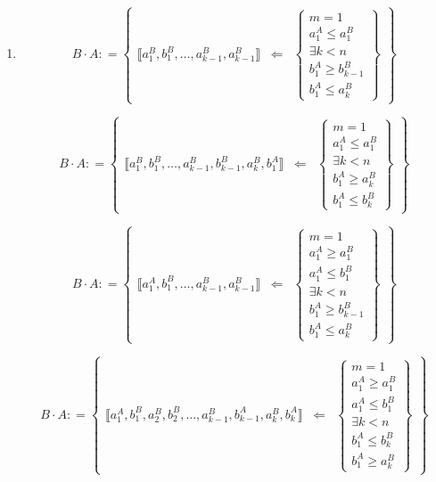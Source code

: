 \documentclass[
]{article}
\begin{document}
\begin{enumerate}
\def\labelenumi{\arabic{enumi}.}
\setcounter{enumi}{5}
\item
  \[{{B \cdot A}{: =}}\begin{Bmatrix}
  {⟦{{a_{1}^{B},b_{1}^{B}},\ldots,{a_{k - 1}^{B},a_{k - 1}^{B}}}⟧} & {\Leftarrow} & \begin{Bmatrix}
  {m = 1} \\
  {a_{1}^{A} \leq a_{1}^{B}} \\
  {\exists{k < n}} \\
  {b_{1}^{A} \geq b_{k - 1}^{B}} \\
  {b_{1}^{A} \leq a_{k}^{B}}
  \end{Bmatrix}
  \end{Bmatrix}\]

  \[{{B \cdot A}{: =}}\begin{Bmatrix}
  {⟦{{a_{1}^{B},b_{1}^{B}},\ldots,{a_{k - 1}^{B},b_{k - 1}^{B}},{a_{k}^{B},b_{1}^{A}}}⟧} & {\Leftarrow} & \begin{Bmatrix}
  {m = 1} \\
  {a_{1}^{A} \leq a_{1}^{B}} \\
  {\exists{k < n}} \\
  {b_{1}^{A} \geq a_{k}^{B}} \\
  {b_{1}^{A} \leq b_{k}^{B}}
  \end{Bmatrix}
  \end{Bmatrix}\]

  \[{{B \cdot A}{: =}}\begin{Bmatrix}
  {⟦{{a_{1}^{A},b_{1}^{B}},\ldots,{a_{k - 1}^{B},a_{k - 1}^{B}}}⟧} & {\Leftarrow} & \begin{Bmatrix}
  {m = 1} \\
  {a_{1}^{A} \geq a_{1}^{B}} \\
  {a_{1}^{A} \leq b_{1}^{B}} \\
  {\exists{k < n}} \\
  {b_{1}^{A} \geq b_{k - 1}^{B}} \\
  {b_{1}^{A} \leq a_{k}^{B}}
  \end{Bmatrix}
  \end{Bmatrix}\]

  \[{{B \cdot A}{: =}}\begin{Bmatrix}
  {⟦{{a_{1}^{A},b_{1}^{B}},{a_{2}^{B},b_{2}^{B}},\ldots,{a_{k - 1}^{B},b_{k - 1}^{A}},{a_{k}^{B},b_{k}^{A}}}⟧} & \Leftarrow & \begin{Bmatrix}
  {m = 1} \\
  {a_{1}^{A} \geq a_{1}^{B}} \\
  {a_{1}^{A} \leq b_{1}^{B}} \\
  {\exists{k < n}} \\
  {b_{1}^{A} \leq b_{k}^{B}} \\
  {b_{1}^{A} \geq a_{k}^{B}}
  \end{Bmatrix}
  \end{Bmatrix}\]


\end{enumerate}
\end{document}
